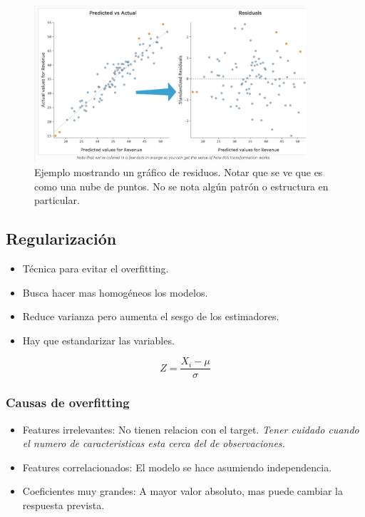 \documentclass[titlepage,a4paper]{article}
\begin{document}
\begin{figure}[!htb]
    \centering
    \includegraphics[width=0.9\textwidth]{imagenesResumen/ResidualPlot.png}
    \caption{Ejemplo mostrando un gráfico de residuos. Notar que se ve que es como una nube de puntos. No se nota algún patrón o estructura en particular.}
\end{figure}


\subsection{Regularización} \label{regularizaciones}
\begin{itemize}
    \item Técnica para evitar el overfitting.
    \item Busca hacer mas homogéneos los modelos.
    \item Reduce varianza pero aumenta el sesgo de los estimadores.
    \item Hay que estandarizar las variables.
\end{itemize}

\begin{equation}
    Z = \frac{X_i - \mu}{\sigma}
\end{equation}

\subsubsection*{Causas de overfitting}
\begin{itemize}
    \item Features irrelevantes: No tienen relacion con el target. \textit{Tener cuidado cuando el numero de caracteristicas esta cerca del de observaciones.}
    \item Features correlacionados: El modelo se hace asumiendo independencia.
    \item Coeficientes muy grandes: A mayor valor absoluto, mas puede cambiar la respuesta prevista.
\end{itemize}
\end{document}
